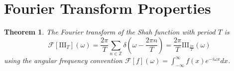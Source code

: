 \documentclass{article}
\newtheorem{theorem}{Theorem}
\begin{document}
\section{Fourier Transform Properties}

\begin{theorem}
  \label{thm:shah_fourier}The Fourier transform of the Shah function with
  period $T$ is
  \begin{equation}
    \label{eq:shah_fourier_transform} \mathcal{F} [\text{III}_T] (\omega) =
    \frac{2 \pi}{T}  \sum_{n \in \mathbb{Z}} \delta \left( \omega - \frac{2
    \pi n}{T} \right) = \frac{2 \pi}{T} \text{III}_{\frac{2 \pi}{T}} (\omega)
  \end{equation}
  using the angular frequency convention $\mathcal{F} [f] (\omega) = \int_{-
  \infty}^{\infty} f (x) e^{- i \omega x} dx$.
\end{theorem}
\end{document}

